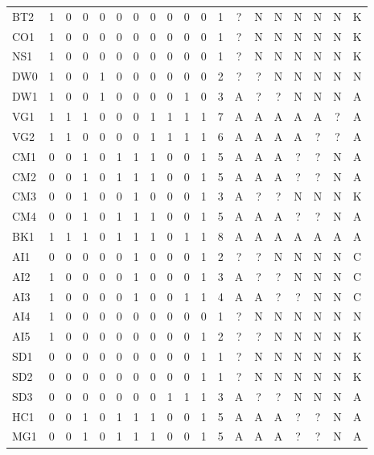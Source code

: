 {\begin{longtable}{@{}lcccccccccccccccccc@{}}
BT2 & 1 & 0 & 0 & 0 & 0 & 0 & 0 & 0 & 0 & 0 & 1 & ? & N & N & N & N & N & K \\
CO1 & 1 & 0 & 0 & 0 & 0 & 0 & 0 & 0 & 0 & 0 & 1 & ? & N & N & N & N & N & K \\
NS1 & 1 & 0 & 0 & 0 & 0 & 0 & 0 & 0 & 0 & 0 & 1 & ? & N & N & N & N & N & K \\
DW0 & 1 & 0 & 0 & 1 & 0 & 0 & 0 & 0 & 0 & 0 & 2 & ? & ? & N & N & N & N & N \\
DW1 & 1 & 0 & 0 & 1 & 0 & 0 & 0 & 0 & 1 & 0 & 3 & A & ? & ? & N & N & N & A \\
VG1 & 1 & 1 & 1 & 0 & 0 & 0 & 1 & 1 & 1 & 1 & 7 & A & A & A & A & A & ? & A \\
VG2 & 1 & 1 & 0 & 0 & 0 & 0 & 1 & 1 & 1 & 1 & 6 & A & A & A & A & ? & ? & A \\
CM1 & 0 & 0 & 1 & 0 & 1 & 1 & 1 & 0 & 0 & 1 & 5 & A & A & A & ? & ? & N & A \\
CM2 & 0 & 0 & 1 & 0 & 1 & 1 & 1 & 0 & 0 & 1 & 5 & A & A & A & ? & ? & N & A \\
CM3 & 0 & 0 & 1 & 0 & 0 & 1 & 0 & 0 & 0 & 1 & 3 & A & ? & ? & N & N & N & K \\
CM4 & 0 & 0 & 1 & 0 & 1 & 1 & 1 & 0 & 0 & 1 & 5 & A & A & A & ? & ? & N & A \\
BK1 & 1 & 1 & 1 & 0 & 1 & 1 & 1 & 0 & 1 & 1 & 8 & A & A & A & A & A & A & A \\
AI1 & 0 & 0 & 0 & 0 & 0 & 1 & 0 & 0 & 0 & 1 & 2 & ? & ? & N & N & N & N & C \\
AI2 & 1 & 0 & 0 & 0 & 0 & 1 & 0 & 0 & 0 & 1 & 3 & A & ? & ? & N & N & N & C \\
AI3 & 1 & 0 & 0 & 0 & 0 & 1 & 0 & 0 & 1 & 1 & 4 & A & A & ? & ? & N & N & C \\
AI4 & 1 & 0 & 0 & 0 & 0 & 0 & 0 & 0 & 0 & 0 & 1 & ? & N & N & N & N & N & N \\
AI5 & 1 & 0 & 0 & 0 & 0 & 0 & 0 & 0 & 0 & 1 & 2 & ? & ? & N & N & N & N & K \\
SD1 & 0 & 0 & 0 & 0 & 0 & 0 & 0 & 0 & 0 & 1 & 1 & ? & N & N & N & N & N & K \\
SD2 & 0 & 0 & 0 & 0 & 0 & 0 & 0 & 0 & 0 & 1 & 1 & ? & N & N & N & N & N & K \\
SD3 & 0 & 0 & 0 & 0 & 0 & 0 & 0 & 1 & 1 & 1 & 3 & A & ? & ? & N & N & N & A \\
HC1 & 0 & 0 & 1 & 0 & 1 & 1 & 1 & 0 & 0 & 1 & 5 & A & A & A & ? & ? & N & A \\
MG1 & 0 & 0 & 1 & 0 & 1 & 1 & 1 & 0 & 0 & 1 & 5 & A & A & A & ? & ? & N & A \\

\end{longtable}}
